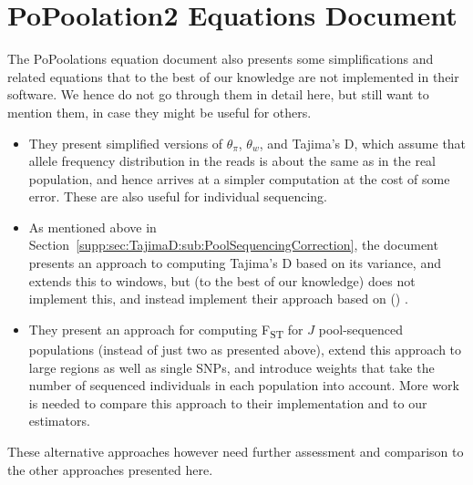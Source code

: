 \documentclass[a4paper,fontsize=9pt,DIV=14]{scrartcl}
\newcounter{todo}
\newcounter{popoolissue}
\newcommand\todo[1]{}
\newcommand\popoolissue[1]{}
\newcommand\toolname{\textsc}
\newcommand\secref[1]{Section~\ref{#1}}
\newcommand{\fst}{F\textsubscript{ST}}
\newcommand\citeay[1]{\citeauthor{#1} (\citeyear{#1}) \cite{#1}}
\begin{document}


\section{PoPoolation2 Equations Document}
\label{supp:sec:PoPoolation2Equations}

The PoPoolations equation document also presents some simplifications and related equations that to the best of our knowledge are not implemented in their software.
We hence do not go through them in detail here, but still want to mention them, in case they might be useful for others.

\begin{itemize}
  \item They present simplified versions of $\theta_\pi$, $\theta_w$, and Tajima's D, which assume that allele frequency distribution in the reads is about the same as in the real population, and hence arrives at a simpler computation at the cost of some error. These are also useful for individual sequencing.
  \item As mentioned above in \secref{supp:sec:TajimaD:sub:PoolSequencingCorrection}, the document presents an approach to computing Tajima's D based on its variance, and extends this to windows, but (to the best of our knowledge) does not implement this, and instead implement their approach based on \citeay{Achaz2008}.
  \item They present an approach for computing \fst{} for $J$ pool-sequenced populations (instead of just two as presented above), extend this approach to large regions as well as single SNPs, and introduce weights that take the number of sequenced individuals in each population into account. More work is needed to compare this approach to their implementation and to our estimators.
\end{itemize}

These alternative approaches however need further assessment and comparison to the other approaches presented here.

\popoolissue{Lastly, we wanted to note that to us it seems that some equations in the PoPoolation equations document are not actually implemented in the code, and that the code contains compuations that are not in the document. We hence think that those were never intended to go hand in hand, and that hence the equations document is also not part of the official publication, but merely found in the code repository. Is that assessment correct, or are there other reasons for the divergence between the two?}
\end{document}
